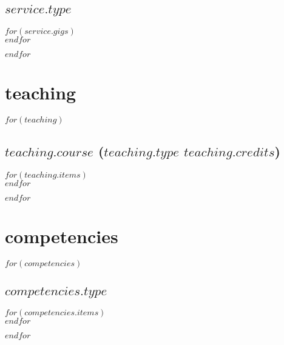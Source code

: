 \documentclass[11pt, a4paper]{article}
\begin{document}
  \subsection{$service.type$}
  \begin{separator}
  $for(service.gigs)$
    \\
    \vspace{.5ex}
  $endfor$
  \vspace{-.5ex}
  \end{separator}
$endfor$
\newpage
\section{teaching}
$for(teaching)$
  \subsection{$teaching.course$ ($teaching.type$ $teaching.credits$)}
  \begin{separator}
    $for(teaching.items)$
      \\
      \vspace{.5ex}
    $endfor$
    \vspace{-.5ex}
  \end{separator}
$endfor$

\section{competencies}
$for(competencies)$
  \subsection{$competencies.type$}
  \begin{separator}
    $for(competencies.items)$
      \\
      \vspace{.5ex}
    $endfor$
    \vspace{-.5ex}
  \end{separator}
$endfor$
\end{document}
